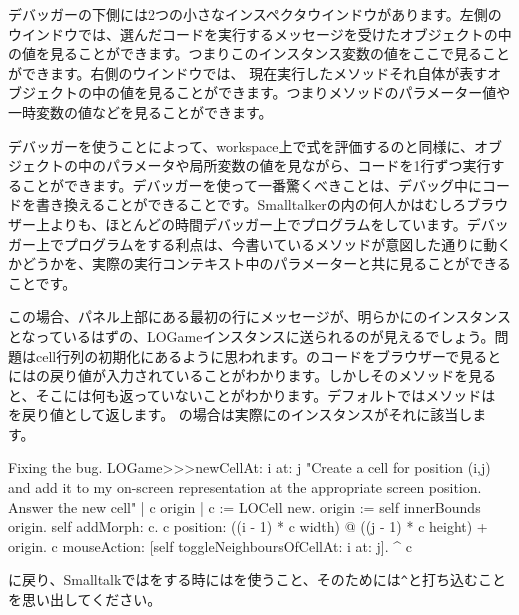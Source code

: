 \documentclass[a4paper,10pt,twoside]{book}
\begin{document}
デバッガーの下側には2つの小さなインスペクタウインドウがあります。左側のウインドウでは、選んだコードを実行するメッセージを受けたオブジェクトの中の値を見ることができます。つまりこのインスタンス変数の値をここで見ることができます。右側のウインドウでは、 現在実行したメソッドそれ自体が表すオブジェクトの中の値を見ることができます。つまりメソッドのパラメーター値や一時変数の値などを見ることができます。

デバッガーを使うことによって、workspace上で式を評価するのと同様に、オブジェクトの中のパラメータや局所変数の値を見ながら、コードを1行ずつ実行することができます。デバッガーを使って一番驚くべきことは、デバッグ中にコードを書き換えることができることです。Smalltalkerの内の何人かはむしろブラウザー上よりも、ほとんどの時間デバッガー上でプログラムをしています。デバッガー上でプログラムをする利点は、今書いているメソッドが意図した通りに動くかどうかを、実際の実行コンテキスト中のパラメーターと共に見ることができることです。

この場合、パネル上部にある最初の行にメッセージが、明らかにのインスタンスとなっているはずの、LOGameインスタンスに送られるのが見えるでしょう。問題はcell行列の初期化にあるように思われます。のコードをブラウザーで見るとにはの戻り値が入力されていることがわかります。しかしそのメソッドを見ると、そこには何も返っていないことがわかります。デフォルトではメソッドは を戻り値として返します。  の場合は実際にのインスタンスがそれに該当します。

\dothis{デバッガーウインドウを閉じで下さい。
その後\ct{c}を返すために、``\ct{^ c}''式を \ct{LOGame>>>newCellAt:at:}メソッドの最後に追加して下さい。
(\mthref{newCellAt:at:nobug}参照。)}

\begin{method}{Fixing the bug.}
LOGame>>>newCellAt: i at: j
   "Create a cell for position (i,j) and add it to my on-screen
   representation at the appropriate screen position.  Answer the new cell"
   | c origin |
   c := LOCell new.
   origin := self innerBounds origin.
   self addMorph: c.
   c position: ((i - 1) * c width) @ ((j - 1) * c height) + origin.
   c mouseAction: [self toggleNeighboursOfCellAt: i at: j].
   ^ c
\end{method}

\noindent
{}に戻り、Smalltalkではをする時には\ct{^}を使うこと、そのためには\verb|^|と打ち込むことを思い出してください。
\end{document}
